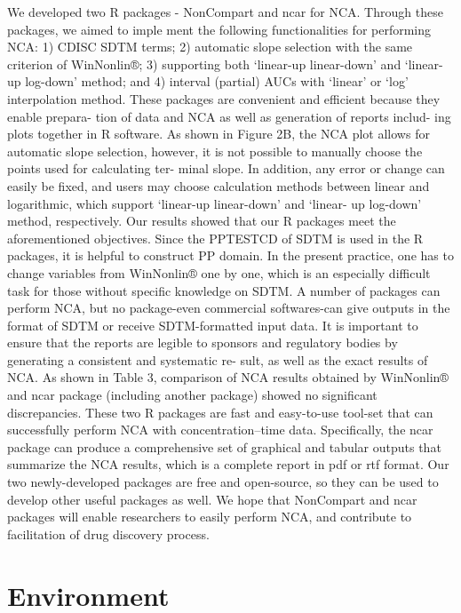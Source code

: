 \documentclass[12pt,]{krantz}
\theoremstyle{definition}
\theoremstyle{definition}
\theoremstyle{definition}
\theoremstyle{remark}
\begin{document}
We developed two R packages - NonCompart and ncar for NCA. Through these
packages, we aimed to imple ment the following functionalities for
performing NCA: 1) CDISC SDTM terms; 2) automatic slope selection with
the same criterion of WinNonlin®; 3) supporting both `linear-up
linear-down' and `linear-up log-down' method; and 4) interval (partial)
AUCs with `linear' or `log' interpolation method. These packages are
convenient and efficient because they enable prepara- tion of data and
NCA as well as generation of reports includ- ing plots together in R
software. As shown in Figure 2B, the NCA plot allows for automatic slope
selection, however, it is not possible to manually choose the points
used for calculating ter- minal slope. In addition, any error or change
can easily be fixed, and users may choose calculation methods between
linear and logarithmic, which support `linear-up linear-down' and
`linear- up log-down' method, respectively. Our results showed that our
R packages meet the aforementioned objectives. Since the PPTESTCD of
SDTM is used in the R packages, it is helpful to construct PP domain. In
the present practice, one has to change variables from WinNonlin® one by
one, which is an especially difficult task for those without specific
knowledge on SDTM. A number of packages can perform NCA, but no
package-even commercial softwares-can give outputs in the format of SDTM
or receive SDTM-formatted input data. It is important to ensure that the
reports are legible to sponsors and regulatory bodies by generating a
consistent and systematic re- sult, as well as the exact results of NCA.
As shown in Table 3, comparison of NCA results obtained by WinNonlin®
and ncar package (including another package) showed no significant
discrepancies. These two R packages are fast and easy-to-use tool-set
that can successfully perform NCA with concentration--time data.
Specifically, the ncar package can produce a comprehensive set of
graphical and tabular outputs that summarize the NCA results, which is a
complete report in pdf or rtf format. Our two newly-developed packages
are free and open-source, so they can be used to develop other useful
packages as well. We hope that NonCompart and ncar packages will enable
researchers to easily perform NCA, and contribute to facilitation of
drug discovery process.

\appendix {}


\chapter{Environment}\label{environment}
\end{document}
